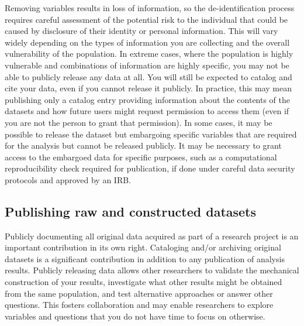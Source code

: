 Removing variables results in loss of information, so the de-identification process
requires careful assessment of the potential risk to the individual
that could be caused by disclosure of their identity or personal information.
This will vary widely depending on the types of information
you are collecting and the overall vulnerability of the population.
In extreme cases, where the population is highly vulnerable
and combinations of information are highly specific,
you may not be able to publicly release any data at all.
You will still be expected to catalog and cite your data,
even if you cannot release it publicly.
In practice, this may mean publishing only a catalog entry
providing information about the contents of the datasets
and how future users might request permission to access them
(even if you are not the person to grant that permission).
In some cases, it may be possible to release the dataset but
embargoing specific variables that are required for the analysis but cannot be released publicly.
It may be necessary to grant access to the embargoed data for specific purposes,
such as a computational reproducibility check required for publication,
if done under careful data security protocols and approved by an IRB.

\subsection{Publishing raw and constructed datasets}

Publicly documenting all original data acquired as part of a research project
is an important contribution in its own right.
Cataloging and/or archiving original datasets
is a significant contribution in addition to any publication of analysis results.
Publicly releasing data allows other researchers
to validate the mechanical construction of your results,
investigate what other results might be obtained from the same population,
and test alternative approaches or answer other questions.
This fosters collaboration and may enable researchers to explore variables and
questions that you do not have time to focus on otherwise.

